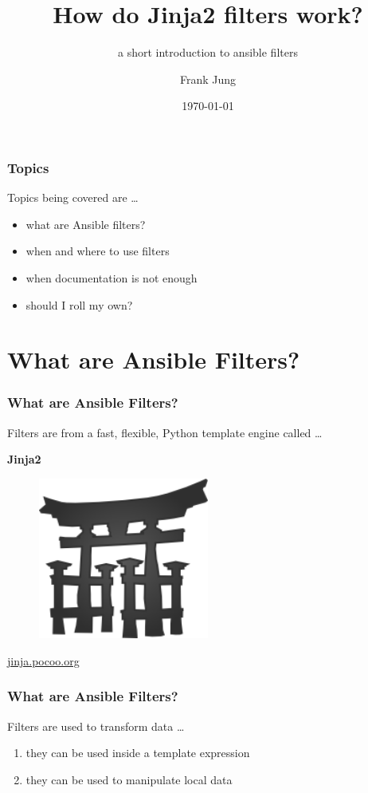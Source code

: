 \documentclass[pdf]{beamer}
\title{How do Jinja2 filters work?}
\subtitle{a short introduction to ansible filters}
\author{Frank Jung}
\institute{frankhjung@linux.com}
\date{ \today }
\begin{document}
\begin{frame}
  \titlepage{}
\end{frame}


\begin{frame}
  \frametitle{Topics}
  Topics being covered are \ldots
  \pause{}
  \begin{itemize}
    \item{what are Ansible filters?}
      \pause{}
    \item{when and where to use filters}
      \pause{}
    \item{when documentation is not enough}
      \pause{}
    \item{should I roll my own?}
  \end{itemize}
\end{frame}

\section{What are Ansible Filters?}

\begin{frame}
  \frametitle{What are Ansible Filters?}
  Filters are from a fast, flexible, Python template engine called \ldots
  \pause{}
  \begin{center}
    \textbf{Jinja2}
    \begin{figure}
      \includegraphics[width=0.5\textwidth]{jinja-logo.png}
    \end{figure}
    \href{http://jinja.pocoo.org}{jinja.pocoo.org}
  \end{center}
\end{frame}

\begin{frame}
  \frametitle{What are Ansible Filters?}
  Filters are used to transform data \ldots
  \pause{}
  \begin{enumerate}
    \item{they can be used inside a template expression}
      \pause{}
    \item{they can be used to manipulate local data}
  \end{enumerate}
\end{frame}
\end{document}

